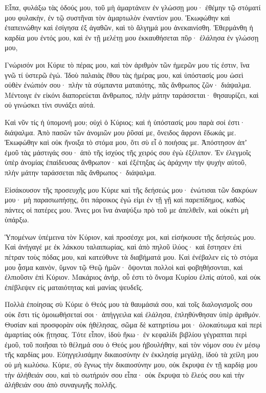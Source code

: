 \begin{spacing}{1.1}
\begin{multicols}{2}
Εἶπα, φυλάξω τὰς ὁδούς μου, τοῦ μὴ ἁμαρτάνειν ἐν γλώσσῃ μου· ἐθέμην τῷ στόματί μου φυλακὴν, ἐν τῷ συστῆναι τὸν ἁμαρτωλὸν ἐναντίον μου.
Ἐκωφώθην καὶ ἐταπεινώθην καὶ ἐσίγησα ἐξ ἀγαθῶν, καὶ τὸ ἄλγημά μου ἀνεκαινίσθη.
Ἐθερμάνθη ἡ καρδία μου ἐντός μου, καὶ ἐν τῇ μελέτῃ μου ἐκκαυθήσεται πῦρ· ἐλάλησα ἐν γλώσσῃ μου,

Γνώρισόν μοι Κύριε τὸ πέρας μου, καὶ τὸν ἀριθμὸν τῶν ἡμερῶν μου τίς ἐστιν, ἵνα γνῶ τί ὑστερῶ ἐγώ.
Ἰδοὺ παλαιὰς ἔθου τὰς ἡμέρας μου, καὶ ὑπόστασίς μου ὡσεὶ οὐθὲν ἐνώπιόν σου· πλὴν τὰ σύμπαντα ματαιότης, πᾶς ἄνθρωπος ζῶν· διάψαλμα.
Μέντοιγε ἐν εἰκόνι διαπορεύεται ἄνθρωπος, πλὴν μάτην ταράσσεται· θησαυρίζει, καὶ οὐ γινώσκει τίνι συνάξει αὐτά.

Καὶ νῦν τίς ἡ ὑπομονή μου; οὐχὶ ὁ Κύριος; καὶ ἡ ὑπόστασίς μου παρὰ σοί ἐστι· διάψαλμα.
Ἀπὸ πασῶν τῶν ἀνομιῶν μου ῥῦσαί με, ὄνειδος ἄφρονι ἔδωκάς με.
Ἐκωφώθην καὶ οὐκ ἤνοιξα τὸ στόμα μου, ὅτι σὺ εἶ ὁ ποιήσας με.
Ἀπόστησον ἀπʼ ἐμοῦ τὰς μάστιγάς σου· ἀπὸ τῆς ἰσχύος τῆς χειρός σου ἐγὼ ἐξέλιπον.
Ἐν ἐλεγμοῖς ὑπὲρ ἀνομίας ἐπαίδευσας ἄνθρωπον· καὶ ἐξέτηξας ὡς ἀράχνην τὴν ψυχὴν αὐτοῦ, πλὴν μάτην ταράσσεται πᾶς ἄνθρωπος· διάψαλμα.

Εἰσάκουσον τῆς προσευχῆς μου Κύριε καὶ τῆς δεήσεώς μου· ἐνώτισαι τῶν δακρύων μου· μὴ παρασιωπήσῃς, ὅτι πάροικος ἐγώ εἰμι ἐν τῇ γῇ καὶ παρεπίδημος, καθὼς πάντες οἱ πατέρες μου.
Ἄνες μοι ἵνα ἀναψύξω πρὸ τοῦ με ἀπελθεῖν, καὶ οὐκέτι μὴ ὑπάρξω.

Ὑπομένων ὑπέμεινα τὸν Κύριον, καὶ προσέσχε μοι, καὶ εἰσήκουσε τῆς δεήσεώς μου.
Καὶ ἀνήγαγέ με ἐκ λάκκου ταλαιπωρίας, καὶ ἀπὸ πηλοῦ ἰλύος· καὶ ἔστησεν ἐπὶ πέτραν τοὺς πόδας μου, καὶ κατεύθυνε τὰ διαβήματά μου.
Καὶ ἐνέβαλεν εἰς τὸ στόμα μου ᾆσμα καινὸν, ὕμνον τῷ Θεῷ ἡμῶν· ὄψονται πολλοὶ καὶ φοβηθήσονται, καὶ ἐλπιοῦσιν ἐπὶ Κύριον.
Μακάριος ἀνὴρ, οὗ ἐστι τὸ ὄνομα Κυρίου ἐλπὶς αὐτοῦ, καὶ οὐκ ἐπέβλεψεν εἰς ματαιότητας καὶ μανίας ψευδεῖς.

Πολλὰ ἐποίησας σὺ Κύριε ὁ Θεός μου τὰ θαυμάσιά σου, καὶ τοῖς διαλογισμοῖς σου οὐκ ἔστι τίς ὁμοιωθήσεταί σοι· ἀπήγγειλα καὶ ἐλάλησα, ἐπληθύνθησαν ὑπὲρ ἀριθμόν.
Θυσίαν καὶ προσφορὰν οὐκ ἠθέλησας, σῶμα δὲ κατηρτίσω μοι· ὁλοκαύτωμα καὶ περὶ ἁμαρτίας οὐκ ᾔτησας.
Τότε εἶπον, ἰδοὺ ἥκω· ἐν κεφαλίδι βιβλίου γέγραπται περὶ ἐμοῦ,
τοῦ ποιῆσαι τὸ θέλημά σου ὁ Θεός μου ἠβουλήθην, καὶ τὸν νόμον σου ἐν μέσῳ τῆς καρδίας μου.
Εὐηγγελισάμην δικαιοσύνην ἐν ἐκκλησίᾳ μεγάλῃ, ἰδοὺ τὰ χείλη μου οὐ μὴ κωλύσω. Κύριε, σὺ ἔγνως
τὴν δικαιοσύνην μου, οὐκ ἔκρυψα ἐν τῇ καρδίᾳ μου τὴν ἀλήθειάν σου, καὶ τὸ σωτήριόν σου εἶπα· οὐκ ἔκρυψα τὸ ἔλεός σου καὶ τὴν ἀλήθειάν σου ἀπὸ συναγωγῆς πολλῆς.


\end{multicols}
\end{spacing}
